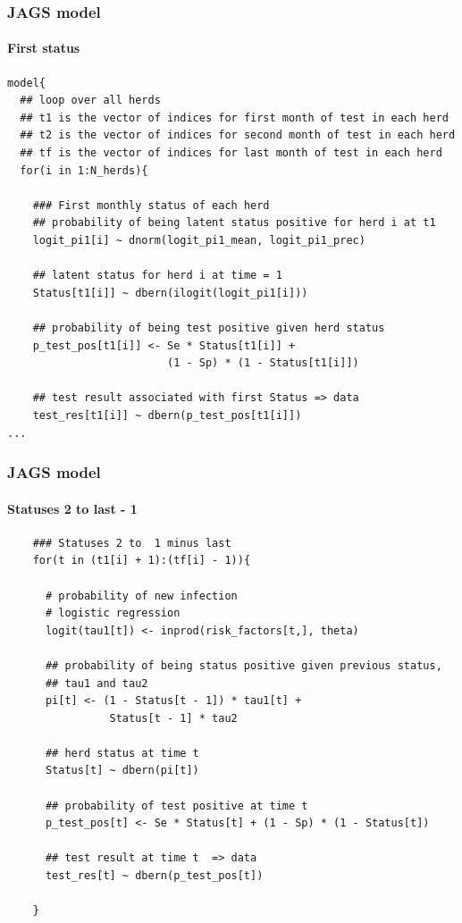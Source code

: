 \documentclass{beamer}
\begin{document}
\begin{frame}[fragile]
\frametitle{JAGS model}
\framesubtitle{First status}
\scriptsize
\begin{verbatim}
model{
  ## loop over all herds
  ## t1 is the vector of indices for first month of test in each herd
  ## t2 is the vector of indices for second month of test in each herd
  ## tf is the vector of indices for last month of test in each herd
  for(i in 1:N_herds){
    
    ### First monthly status of each herd
    ## probability of being latent status positive for herd i at t1
    logit_pi1[i] ~ dnorm(logit_pi1_mean, logit_pi1_prec)
    
    ## latent status for herd i at time = 1
    Status[t1[i]] ~ dbern(ilogit(logit_pi1[i]))
  
    ## probability of being test positive given herd status
    p_test_pos[t1[i]] <- Se * Status[t1[i]] + 
                         (1 - Sp) * (1 - Status[t1[i]])
    
    ## test result associated with first Status => data
    test_res[t1[i]] ~ dbern(p_test_pos[t1[i]])
...    
\end{verbatim}
\end{frame}


\begin{frame}[fragile]
\frametitle{JAGS model}
\framesubtitle{Statuses 2 to last - 1}
\scriptsize
\begin{verbatim}
    ### Statuses 2 to  1 minus last
    for(t in (t1[i] + 1):(tf[i] - 1)){
      
      # probability of new infection
      # logistic regression
      logit(tau1[t]) <- inprod(risk_factors[t,], theta)
      
      ## probability of being status positive given previous status,
      ## tau1 and tau2
      pi[t] <- (1 - Status[t - 1]) * tau1[t] +
                Status[t - 1] * tau2
      
      ## herd status at time t
      Status[t] ~ dbern(pi[t])
      
      ## probability of test positive at time t
      p_test_pos[t] <- Se * Status[t] + (1 - Sp) * (1 - Status[t])
      
      ## test result at time t  => data
      test_res[t] ~ dbern(p_test_pos[t])
      
    }
 \end{verbatim}
\end{frame}
\end{document}
